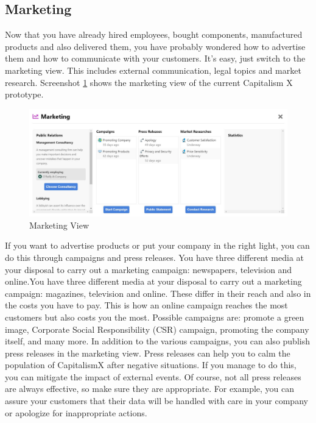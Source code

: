 \subsection{Marketing} \label{marketing_manual}

Now that you have already hired employees, bought components, manufactured products and also delivered them, you have probably wondered how to advertise them and how to communicate with your customers. It's easy, just switch to the marketing view. This includes external communication, legal topics and market research.
Screenshot \ref{fig:marketing_view} shows the marketing view of the current Capitalism X prototype.

\begin{figure}
    \centering
    \includegraphics [width=\textwidth]{images/marketing_view.png}
    \caption{Marketing View}
    \label{fig:marketing_view}
\end{figure}

If you want to advertise products or put your company in the right light, you can do this through campaigns and press releases. You have three different media at your disposal to carry out a marketing campaign: newspapers, television and online.You have three different media at your disposal to carry out a marketing campaign: magazines, television and online. These differ in their reach and also in the costs you have to pay. This is how an online campaign reaches the most customers but also costs you the most. Possible campaigns are: promote a green image, Corporate Social Responsibility (\gls{CSR}) campaign, promoting the company itself, and many more.
In addition to the various campaigns, you can also publish press releases in the marketing view. Press releases can help you to calm the population of CapitalismX after negative situations. If you manage to do this, you can mitigate the impact of external events. Of course, not all press releases are always effective, so make sure they are appropriate. 
For example, you can assure your customers that their data will be handled with care in your company or apologize for inappropriate actions.

